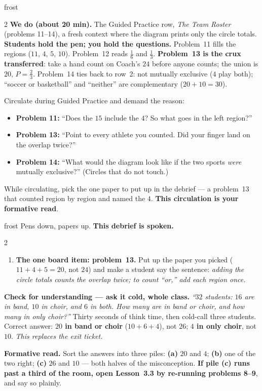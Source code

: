 \documentclass[10pt]{article}
\begin{document}
\begin{skillbox}{frost}
\begin{multicols}{2}
\columnbreak
\textbf{We do (about 20 min).} The Guided Practice row, \emph{The Team Roster} (problems 11--14),
a fresh context where the diagram prints only the circle totals. \textbf{Students hold the pen; you
hold the questions.} Problem~11 fills the regions ($11$, $4$, $5$, $10$). Problem~12 reads
$\frac16$ and $\frac13$. \textbf{Problem~13 is the crux transferred}: take a hand count on Coach's
$24$ before anyone counts; the union is $20$, $P = \frac23$. Problem~14 ties back to row~2: not
mutually exclusive ($4$ play both); ``soccer or basketball'' and ``neither'' are complementary
($20 + 10 = 30$).

Circulate during Guided Practice and demand the reason:
\begin{itemize}[leftmargin=1.1em, nosep]
  \item \textbf{Problem 11:} ``Does the $15$ include the $4$? So what goes in the left region?''
  \item \textbf{Problem 13:} ``Point to every athlete you counted. Did your finger land on the
        overlap twice?''
  \item \textbf{Problem 14:} ``What would the diagram look like if the two sports \emph{were}
        mutually exclusive?'' (Circles that do not touch.)
\end{itemize}
While circulating, pick the one paper to put up in the debrief --- a problem~13 that counted
region by region and named the $4$. \textbf{This circulation is your formative read}.
\end{multicols}
\end{skillbox}

\boxguard[24]
\begin{skillbox}{frost}
Pens down, papers up. \textbf{This debrief is spoken.}
\begin{multicols}{2}
\begin{enumerate}[leftmargin=1.3em, nosep, itemsep=3pt]
  \item \textbf{The one board item: problem~13.} Put up the paper you picked ($11 + 4 + 5 = 20$,
        not $24$) and make a student say the sentence: \emph{adding the circle totals counts the
        overlap twice; to count ``or,'' add each region once.}
\end{enumerate}
\columnbreak
\textbf{Check for understanding --- ask it cold, whole class.} \emph{``$32$ students: $16$ are in
band, $10$ in choir, and $6$ in both. How many are in band or choir, and how many in only choir?''}
Thirty seconds of think time, then cold-call three students. Correct answer: \textbf{$20$ in band
or choir} ($10 + 6 + 4$), not $26$; \textbf{$4$ in only choir}, not $10$. \emph{This replaces the
exit ticket.}

\textbf{Formative read.} Sort the answers into three piles: \textbf{(a)} $20$ and $4$;
\textbf{(b)} one of the two right; \textbf{(c)} $26$ and $10$ --- both halves of the
misconception. \textbf{If pile (c) runs past a third of the room, open Lesson~3.3 by re-running
problems 8--9}, and say so plainly.
\end{multicols}
\end{skillbox}
\end{document}
